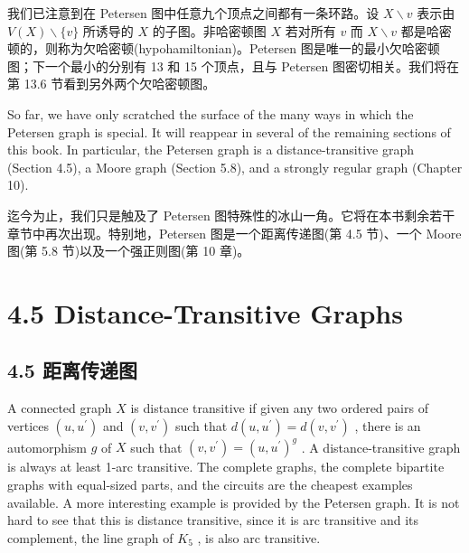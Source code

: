 \documentclass[10pt]{article}
\begin{document}
\begin{tcolorbox}\relax
我们已注意到在 Petersen 图中任意九个顶点之间都有一条环路。设 \(X \smallsetminus  v\) 表示由 \(V\left( X\right)  \smallsetminus  \{ v\}\) 所诱导的 \(X\) 的子图。非哈密顿图 \(X\) 若对所有 \(v\) 而 \(X \smallsetminus  v\) 都是哈密顿的，则称为欠哈密顿(hypohamiltonian)。Petersen 图是唯一的最小欠哈密顿图；下一个最小的分别有 13 和 15 个顶点，且与 Petersen 图密切相关。我们将在第 13.6 节看到另外两个欠哈密顿图。
\end{tcolorbox}

So far, we have only scratched the surface of the many ways in which the Petersen graph is special. It will reappear in several of the remaining sections of this book. In particular, the Petersen graph is a distance-transitive graph (Section 4.5), a Moore graph (Section 5.8), and a strongly regular graph (Chapter 10).

\begin{tcolorbox}\relax
迄今为止，我们只是触及了 Petersen 图特殊性的冰山一角。它将在本书剩余若干章节中再次出现。特别地，Petersen 图是一个距离传递图(第 4.5 节)、一个 Moore 图(第 5.8 节)以及一个强正则图(第 10 章)。
\end{tcolorbox}

\section*{4.5 Distance-Transitive Graphs}

\begin{tcolorbox}\relax
\section*{4.5 距离传递图}
\end{tcolorbox}

A connected graph \(X\) is distance transitive if given any two ordered pairs of vertices \(\left( {u,{u}^{\prime }}\right)\) and \(\left( {v,{v}^{\prime }}\right)\) such that \(d\left( {u,{u}^{\prime }}\right)  = d\left( {v,{v}^{\prime }}\right)\) , there is an automorphism \(g\) of \(X\) such that \(\left( {v,{v}^{\prime }}\right)  = {\left( u,{u}^{\prime }\right) }^{g}\) . A distance-transitive graph is always at least 1-arc transitive. The complete graphs, the complete bipartite graphs with equal-sized parts, and the circuits are the cheapest examples available. A more interesting example is provided by the Petersen graph. It is not hard to see that this is distance transitive, since it is arc transitive and its complement, the line graph of \({K}_{5}\) , is also arc transitive.
\end{document}
